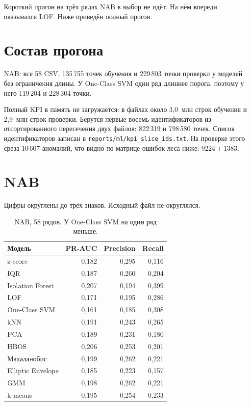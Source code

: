 Короткий прогон на трёх рядах NAB в выбор не идёт.
На нём впереди оказывался LOF.
Ниже приведён полный прогон.

\section{Состав прогона}

NAB: все 58 CSV, 135\,755 точек обучения и 229\,803 точки проверки у моделей без ограничения длины.
У One-Class SVM один ряд длиннее порога, поэтому у него 119\,204 и 228\,304 точки.

Полный KPI в память не загружается: в файлах около 3{,}0~млн строк обучения и 2{,}9~млн строк проверки.
Берутся первые восемь идентификаторов из отсортированного пересечения двух файлов: 822\,319 и 798\,580 точек.
Список идентификаторов записан в \texttt{reports/ml/kpi\_slice\_ids.txt}.
На проверке этого среза 10\,607 аномалий, что видно по матрице ошибок леса ниже: \(9224 + 1383\).

\FloatBarrier
\section{NAB}

Цифры округлены до трёх знаков.
Исходный файл не округлялся.

\begin{table}[ht]
\centering
\small
\begin{tabular}{lrrr}
\toprule
Модель & PR-AUC & Precision & Recall \\
\midrule
z-score & 0{,}182 & 0{,}295 & 0{,}116 \\
IQR & 0{,}187 & 0{,}260 & 0{,}204 \\
Isolation Forest & 0{,}207 & 0{,}194 & 0{,}399 \\
LOF & 0{,}171 & 0{,}195 & 0{,}286 \\
One-Class SVM & 0{,}161 & 0{,}185 & 0{,}308 \\
kNN & 0{,}191 & 0{,}243 & 0{,}265 \\
PCA & 0{,}189 & 0{,}231 & 0{,}180 \\
HBOS & 0{,}206 & 0{,}253 & 0{,}201 \\
Махаланобис & 0{,}199 & 0{,}262 & 0{,}221 \\
Elliptic Envelope & 0{,}185 & 0{,}223 & 0{,}157 \\
GMM & 0{,}198 & 0{,}262 & 0{,}221 \\
k-means & 0{,}195 & 0{,}254 & 0{,}233 \\
\bottomrule
\end{tabular}
\caption{NAB, 58 рядов. У One-Class SVM на один ряд меньше.}
\end{table}

